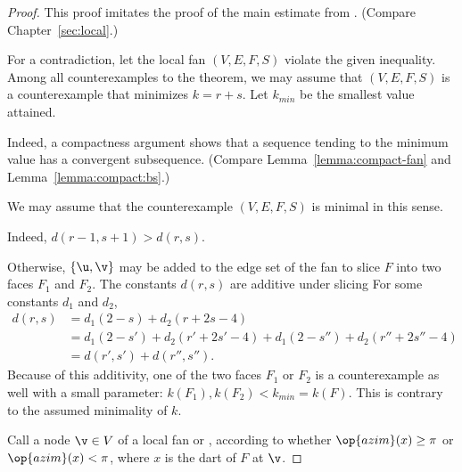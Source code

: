 \begin{proof} This proof imitates the proof of the main estimate from
  \cite{Hales:2006:DCG}.   (Compare
  Chapter~\ref{sec:local}.)

  For a contradiction, let the local fan $(V,E,F,S)$ violate the given
  inequality.  Among all counterexamples to the theorem, we may assume
  that $(V,E,F,S)$ is a counterexample that minimizes $k=r+s$.  Let
  $k_{min}$ be the smallest value attained.



    Indeed, a compactness argument shows that a sequence
tending to the minimum value has a convergent subsequence.  (Compare
Lemma~\ref{lemma:compact-fan} and Lemma~\ref{lemma:compact:bs}.)

We may assume that the counterexample $(V,E,F,S)$ is minimal
in this sense.

  Indeed, $d(r-1,s+1)>d(r,s)$.

  Otherwise, $\{\u,\v\}$ may be added to the edge
set of the fan to slice $F$ into two faces $F_1$ and $F_2$.
The constants $d(r,s)$ are additive under slicing
For some constants $d_1$
and $d_2$,
\begin{align}\label{eqn:drs}
d(r,s) &= d_1 (2 - s) + d_2 (r + 2 s-4) \nonumber\\
&= d_1 (2-s') + d_2 (r'+2 s'-4) + d_1 (2-s'') + d_2 (r''+2s''-4)\nonumber\\
&= d(r',s') + d(r'',s'').
\end{align}
Because of this additivity, one of the two faces $F_1$ or $F_2$ is a
counterexample as well with a small parameter:
$k(F_1),k(F_2)<k_{min}=k(F)$.  This is contrary to the assumed
minimality of $k$.



Call a node $\v\in V$ of a local fan  
or , according
to whether $\op{azim}(x)\ge\pi$ or $\op{azim}(x)<\pi$, where $x$ is
the dart of $F$ at $\v$. 



\end{proof}
